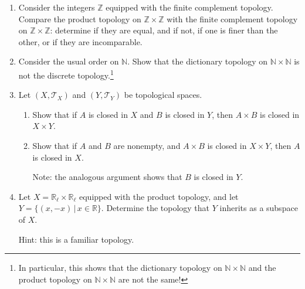 \documentclass[12pt]{article}
\newcommand{\N}{\mathbb{N}}
\newcommand{\Z}{\mathbb{Z}}
\newcommand{\R}{\mathbb{R}}
\newcommand{\T}{\mathcal{T}}
\begin{document}
\begin{enumerate}[roomy]


\item Consider the integers $\Z$ equipped with the finite complement topology. Compare the product topology on $\Z \times \Z$ with the finite complement topology on $\Z \times \Z$: determine if they are equal, and if not, if one is finer than the other, or if they are incomparable.



\item Consider the usual order on $\N$. Show that the dictionary topology on $\N \times \N$ is not the discrete topology.\footnote{In particular, this shows that the dictionary topology on $\N \times \N$ and the product topology on $\N \times \N$ are not the same!}


\item Let $(X, \T_X)$ and $(Y, \T_Y)$ be topological spaces. 


\begin{enumerate}
\item Show that if $A$ is closed in $X$ and $B$ is closed in $Y$, then $A \times B$ is closed in $X \times Y$.


\item Show that if $A$ and $B$ are nonempty, and $A \times B$ is closed in $X \times Y$, then $A$ is closed in $X$.

\noindent
Note: the analogous argument shows that $B$ is closed in $Y$.
\end{enumerate} 


\item Let $X = \R_{\ell} \times \R_{\ell}$ equipped with the product topology, and let $Y = \{(x,-x) \, | \, x \in \R\}$.
Determine the topology that $Y$ inherits as a subspace of $X$.

\noindent
Hint: this is a familiar topology.

\end{enumerate}
\end{document}
